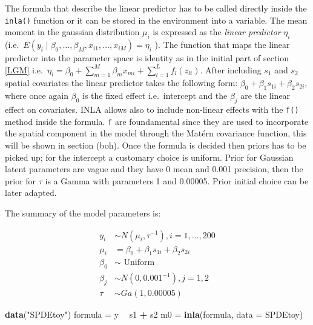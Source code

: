 \documentclass[
  12pt,
  a4paper,
  oneside]{book}
\newenvironment{Shaded}{\begin{snugshade}}{\end{snugshade}}
\newcommand{\DataTypeTok}[1]{\textcolor[rgb]{0.13,0.29,0.53}{#1}}
\newcommand{\KeywordTok}[1]{\textcolor[rgb]{0.13,0.29,0.53}{\textbf{#1}}}
\newcommand{\NormalTok}[1]{#1}
\newcommand{\OperatorTok}[1]{\textcolor[rgb]{0.81,0.36,0.00}{\textbf{#1}}}
\newcommand{\StringTok}[1]{\textcolor[rgb]{0.31,0.60,0.02}{#1}}
\theoremstyle{definition}
\theoremstyle{definition}
\theoremstyle{definition}
\theoremstyle{remark}
\begin{document}
The formula that describe the linear predictor has to be called directly inside the \texttt{inla()} function or it can be stored in the environment into a variable. The mean moment in the gaussian distribution \(\mu_{i}\) is expressed as the \emph{linear predictor} \(\eta_{i}\) (i.e.~\(E\left(y_{i} \mid \beta_{0}, \ldots, \beta_{M}, x_{i 1}, \ldots, x_{i M}\right) = \eta_{i}\) ). The function that maps the linear predictor into the parameter space is identity as in the initial part of section \ref{LGM} i.e.~\(\eta_{i}=\beta_{0}+\sum_{m=1}^{M} \beta_{m} x_{m i}+\sum_{l=1}^{L} f_{l}\left(z_{l i}\right)\).
After including \(s_{1}\) and \(s_{2}\) spatial covariates the linear predictor takes the following form: \(\beta_{0}+\beta_{1} s_{1 i}+\beta_{2} s_{2 i}\), where once again \(\beta_{0}\) is the fixed effect i.e.~intercept and the \(\beta_{j}\) are the linear effect on covariates. INLA allows also to include non-linear effects with the \texttt{f()} method inside the formula. \texttt{f} are foundamental since they are used to incorporate the spatial component in the model through the Matérn covariance function, this will be shown in section (boh).
Once the formula is decided then priors has to be picked up; for the intercept a customary choice is uniform. Prior for Gaussian latent parameters are vague and they have 0 mean and 0.001 precision, then the prior for \(\tau\) is a Gamma with parameters 1 and 0.00005. Prior initial choice can be later adapted.

The summary of the model parameters is:

\[
\begin{aligned}
y_{i} & \sim N\left(\mu_{i}, \tau^{-1}\right), i=1, \ldots, 200 \\
\mu_{i} &=\beta_{0}+\beta_{1} s_{1 i}+\beta_{2} s_{2 i} \\
\beta_{0} & \sim \text { Uniform } \\
\beta_{j} & \sim N\left(0,0.001^{-1}\right), j=1,2 \\
\tau & \sim G a(1,0.00005)
\end{aligned}
\]

\begin{Shaded}
\begin{Highlighting}[]
\KeywordTok{data}\NormalTok{(}\StringTok{"SPDEtoy"}\NormalTok{)}
\NormalTok{formula =}\StringTok{ }\NormalTok{y }\OperatorTok{~}\StringTok{ }\NormalTok{s1 }\OperatorTok{+}\StringTok{ }\NormalTok{s2}
\NormalTok{m0 =}\StringTok{ }\KeywordTok{inla}\NormalTok{(formula, }\DataTypeTok{data =}\NormalTok{ SPDEtoy)}
\end{Highlighting}
\end{Shaded}
\end{document}
